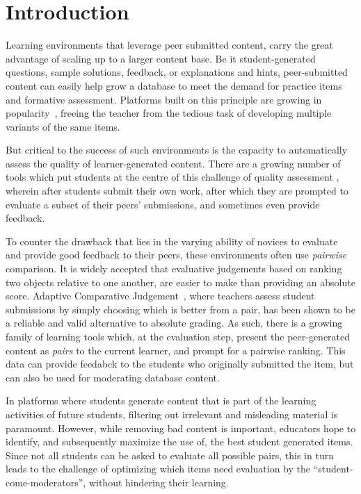\documentclass[runningheads]{llncs}
\begin{document}
\section{Introduction}

Learning environments that leverage peer submitted content, carry the great 
advantage of scaling up to a larger content base.  
Be it student-generated questions, sample solutions, feedback, or explanations 
and hints, peer-submitted content can easily help grow a database to meet the 
demand for practice items and formative assessment.
Platforms built on this principle are growing in 
popularity~\cite{denny_effect_2013}\cite{khosravi_ripple_2019}, freeing the 
teacher from the tedious task of developing multiple variants of the same 
items. 

But critical to the success of such environments is the capacity to 
automatically assess the quality of learner-generated content.
There are a growing number of tools which put students at the centre of this 
challenge of quality assessment
\cite{potter_compair:_2017}\cite{cambre_juxtapeer:_2018},
wherein after students submit their own work, after which they are prompted to 
evaluate a subset of their peers' submissions, and sometimes even provide 
feedback.

To counter the drawback that lies in the varying ability of novices to evaluate 
and provide good feedback to their peers, these environments often use 
\textit{pairwise} comparison. 
It is widely accepted that evaluative judgements based on ranking two objects 
relative to one another, are easier to make than providing an absolute score. 
Adaptive Comparative Judgement~\cite{pollitt_method_2012}, where teachers 
assess student submissions by simply choosing which is better from a pair, has 
been shown to be a reliable and valid alternative to absolute grading.
As such, there is a growing family of learning tools which, at the evaluation 
step, present the peer-generated content as \textit{pairs} to the current 
learner, and prompt for a pairwise ranking. 
This data can provide feedabck to the students who originally submitted the 
item, but can also be used for moderating database content.

In platforms where students generate content that is part of the learning 
activities of future students, filtering out irrelevant and misleading material 
is paramount. 
However, while removing bad content is important, educators hope to identify, 
and subsequently maximize the use of, the best student generated items.
Since not all students can be asked to evaluate all possible pairs, this in 
turn leads to the challenge of optimizing which items need evaluation by the 
``student-come-moderators'', without hindering their learning.
 
\end{document}
